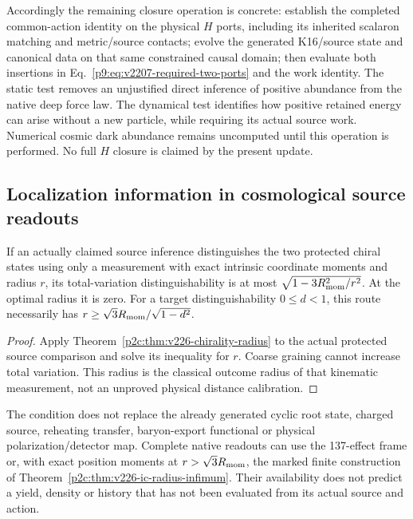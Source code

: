 \documentclass[12pt,a4paper]{article}
\begin{document}
Accordingly the remaining closure operation is concrete: establish the
completed common-action identity on the physical $H$ ports, including
its inherited scalaron matching and metric/source contacts; evolve the
generated K16/source state and canonical data on that same constrained
causal domain; then evaluate both insertions in
Eq.~\eqref{p9:eq:v2207-required-two-ports} and the work identity.
The static test removes an unjustified direct inference of positive
abundance from the native deep force law. The dynamical test identifies
how positive retained energy can arise without a new particle, while
requiring its actual source work. Numerical cosmic dark abundance remains
uncomputed until this operation is performed. No full $H$ closure is
claimed by the present update.


\subsection{Localization information in cosmological source readouts}
\label{p9:sec:v226-cosmological-information}
\begin{corollary}
\label{p9:cor:v226-cosmological-information}
If an actually claimed source inference distinguishes the two protected
chiral states using only a measurement with exact intrinsic coordinate
moments and radius $r$, its total-variation distinguishability is at most
$\sqrt{1-3R_{\rm mom}^2/r^2}$. At the optimal radius it is zero.
For a target distinguishability $0\le d<1$, this route necessarily has
$r\ge\sqrt3R_{\rm mom}/\sqrt{1-d^2}$.
\end{corollary}
\begin{proof}
Apply Theorem~\ref{p2c:thm:v226-chirality-radius} to the actual protected
source comparison and solve its inequality for $r$. Coarse graining cannot
increase total variation. This radius is the classical outcome radius of
that kinematic measurement, not an unproved physical distance calibration.
\end{proof}
The condition does not replace the already generated cyclic root state,
charged source, reheating transfer, baryon-export functional or physical
polarization/detector map. Complete native readouts can use the 137-effect
frame or, with exact position moments at $r>\sqrt3R_{\rm mom}$, the marked
finite construction of Theorem~\ref{p2c:thm:v226-ic-radius-infimum}.
Their availability does not predict a yield, density or history that has
not been evaluated from its actual source and action.
\end{document}

